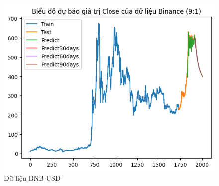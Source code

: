 \documentclass[conference]{IEEEtran}
\begin{document}
\begin{figure}[H]
		\hfill
		\begin{minipage}{0.15\textwidth}
			\centering
			\includegraphics[width=1\textwidth]{Figure/GRU_BNB_91.png}
		\end{minipage}
		\caption{Dữ liệu BNB-USD}
		\label{fig:1}
	\end{figure}
\end{document}
